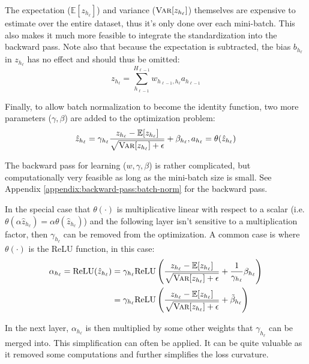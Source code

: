 The expectation ($\mathbb{E}[z_{h_\ell}]$) and variance ($\textsc{Var}[z_{h_\ell}]$) themselves are expensive to estimate over the entire dataset, thus it's only done over each mini-batch. This also makes it much more feasible to integrate the standardization into the backward pass. Note also that because the expectation is subtracted, the bias $b_{h_\ell}$ in $z_{h_\ell}$ has no effect and should thus be omitted:
\begin{equation}
z_{h_\ell} = \sum_{h_{\ell-1}}^{H_{\ell-1}} w_{h_{\ell-1}, h_\ell} a_{h_{\ell-1}} 
\end{equation}

Finally, to allow batch normalization to become the identity function, two more parameters ($\gamma, \beta$) are added to the optimization problem:
\begin{equation}
\hat{z}_{h_\ell} = \gamma_{h_\ell} \frac{z_{h_\ell} - \mathbb{E}[z_{h_\ell}]}{\sqrt{\textsc{Var}[z_{h_\ell}] + \epsilon}} + \beta_{h_\ell}, a_{h_\ell} = \theta(\hat{z}_{h_\ell})
\label{eq:theory:convergence:batch-norm}
\end{equation}

The backward pass for learning ($w, \gamma, \beta$) is rather complicated, but computationally very feasible as long as the mini-batch size is small. See Appendix \ref{appendix:backward-pass:batch-norm} for the backward pass.

In the special case that $\theta(\cdot)$ is multiplicative linear with respect to a scalar (i.e. $\theta(\alpha \hat{z}_{h_\ell}) = \alpha \theta(\hat{z}_{h_\ell})$) and the following layer isn't sensitive to a multiplication factor, then $\gamma_{h_\ell}$ can be removed from the optimization. A common case is where $\theta(\cdot)$ is the ReLU function, in this case:
\begin{equation}
\begin{aligned}
\alpha_{h_\ell} = \mathrm{ReLU}(\hat{z}_{h_\ell}) &= \gamma_{h_\ell} \mathrm{ReLU}\left(\frac{z_{h_\ell} - \mathbb{E}[z_{h_\ell}]}{\sqrt{\textsc{Var}[z_{h_\ell}] + \epsilon}} +  \frac{1}{\gamma_{h_\ell}}\beta_{h_\ell}\right)\\
&= \gamma_{h_\ell} \mathrm{ReLU}\left(\frac{z_{h_\ell} - \mathbb{E}[z_{h_\ell}]}{\sqrt{\textsc{Var}[z_{h_\ell}] + \epsilon}} +  \tilde{\beta}_{h_\ell}\right)
\end{aligned}
\end{equation}

In the next layer, $\alpha_{h_\ell}$ is then multiplied by some other weights that $\gamma_{h_\ell}$ can be merged into. This simplification can often be applied. It can be quite valuable as it removed some computations and further simplifies the loss curvature.

